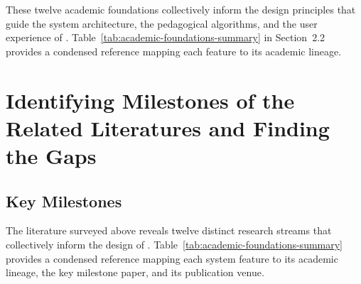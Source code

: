 These twelve academic foundations collectively inform the design principles that guide the system architecture, the pedagogical algorithms, and the user experience of \projectname. Table~\ref{tab:academic-foundations-summary} in Section~2.2 provides a condensed reference mapping each feature to its academic lineage.

\section{Identifying Milestones of the Related Literatures and Finding the Gaps}
\label{sec:milestones-gaps}

\subsection{Key Milestones}

The literature surveyed above reveals twelve distinct research streams that collectively inform the design of \projectname. Table~\ref{tab:academic-foundations-summary} provides a condensed reference mapping each system feature to its academic lineage, the key milestone paper, and its publication venue.

